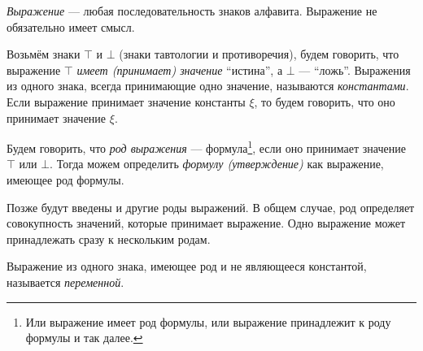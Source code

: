 {\it Выражение} --- любая последовательность знаков алфавита.
Выражение не обязательно имеет смысл.

Возьмём знаки $\top$ и $\bot$ (знаки тавтологии и противоречия),
будем говорить, что выражение $\top$ {\it имеет (принимает) значение} ``истина'',
а $\bot$ --- ``ложь''. Выражения из одного знака, всегда принимающие одно значение,
называются {\it константами}. Если выражение принимает значение константы $\xi$,
то будем говорить, что оно принимает значение $\xi$.

Будем говорить, что {\it род выражения} --- формула\footnote{
	Или выражение имеет род формулы, или выражение принадлежит к роду формулы и так далее.
}, если оно принимает значение $\top$
или $\bot$. Тогда можем определить {\it формулу (утверждение)} как выражение,
имеющее род формулы.

Позже будут введены и другие роды выражений. В общем случае, род определяет
совокупность значений, которые принимает выражение.
Одно выражение может принадлежать сразу к нескольким родам.

Выражение из одного знака, имеющее род и не являющееся константой,
называется {\it переменной}.

